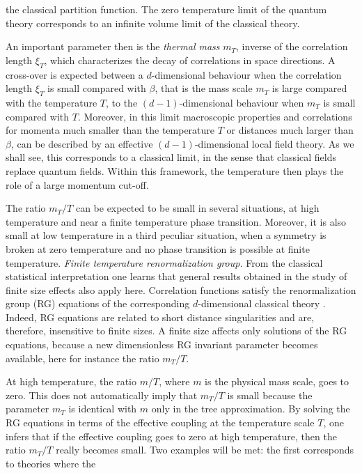 the classical partition function. The zero
temperature limit of the quantum theory corresponds to an infinite volume limit of the classical theory.
  \par
An important parameter then is the {\it thermal mass}\/ $m_T$, inverse of the correlation length $\xi_T $, which characterizes the decay of correlations in space directions. A cross-over is expected between a $d $-dimensional
behaviour when the correlation length $\xi_T$ is small compared with $
\beta $,  that is the mass scale $m_T$ is large compared with the
temperature $T$, to the $(d-1)$-dimensional behaviour when $m_T$ is small compared with $T$. Moreover, in this limit macroscopic properties and correlations for  momenta much
smaller than the temperature $T$ or distances much larger than $ \beta
$, can be described by an effective $(d-1)$-dimensional local field theory.
As we shall see, this corresponds to a classical limit, in the sense that classical fields replace quantum fields.
Within this framework, the temperature then plays the role of a large momentum cut-off.
 \par
The ratio $m_T/T$ can be expected to be small in several situations, at high temperature and near a finite temperature phase transition. Moreover, it is also small at low temperature in a third peculiar situation, when a symmetry is broken at zero temperature and no phase transition is possible at finite temperature.
\smallskip
{\it Finite temperature renormalization group.} From the classical
statistical interpretation one learns that general results
obtained in the study of finite size effects also  apply here.
Correlation functions satisfy the renormalization group (RG)
equations of the corresponding $d $-dimensional classical theory
. Indeed, RG equations are  related to short
distance singularities  and are, therefore, insensitive to finite
sizes. A finite size  affects only  solutions of the RG equations,
because a new dimensionless  RG invariant parameter becomes
available, here for instance the ratio $ m_T/T$.  \par At high
temperature, the ratio $m/T$, where $m$ is the physical mass
scale, goes to zero. This does not automatically imply that
$m_T/T$ is small because  the parameter $m_T$ is identical with
$m$  only in the tree approximation. By solving the RG equations
in terms of the effective coupling at the temperature scale $T$,
one infers that if the effective coupling goes to zero at high
temperature, then the ratio $m_T/T$ really becomes small. Two
examples will be met: the first  corresponds to theories where the
